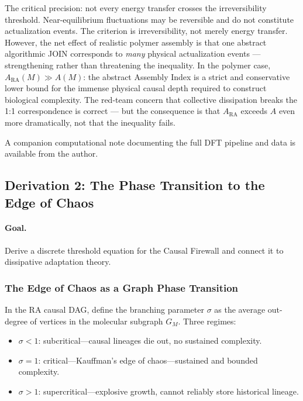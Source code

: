 \documentclass[11pt,a4paper]{article}
\theoremstyle{plain}
\theoremstyle{definition}
\theoremstyle{remark}
\newcommand{\ARA}{A_{\mathrm{RA}}}
\newcommand{\GM}{G_{M}}
\begin{document}
The critical precision: not every energy transfer crosses the irreversibility
threshold. Near-equilibrium fluctuations may be reversible and do not constitute
actualization events. The criterion is irreversibility, not merely energy
transfer. However, the net effect of realistic polymer assembly is that one
abstract algorithmic JOIN corresponds to \emph{many} physical actualization events
--- strengthening rather than threatening the inequality. In the polymer case,
$\ARA(M) \gg A(M)$: the abstract Assembly Index is a strict and conservative
lower bound for the immense physical causal depth required to construct biological
complexity. The red-team concern that collective dissipation breaks the 1:1
correspondence is correct --- but the consequence is that $\ARA$ exceeds $A$ even
more dramatically, not that the inequality fails.

A companion computational note documenting the full DFT pipeline and data is
available from the author.

\subsection{Derivation 2: The Phase Transition to the Edge of Chaos}
\label{sec:firewall-math}

\paragraph{Goal.} Derive a discrete threshold equation for the Causal Firewall
and connect it to dissipative adaptation theory.

\subsubsection{The Edge of Chaos as a Graph Phase Transition}

In the RA causal DAG, define the branching parameter $\sigma$ as the average
out-degree of vertices in the molecular subgraph $\GM$. Three regimes:
\begin{itemize}
  \item $\sigma < 1$: subcritical---causal lineages die out, no sustained complexity.
  \item $\sigma = 1$: critical---Kauffman's edge of chaos---sustained and bounded complexity.
  \item $\sigma > 1$: supercritical---explosive growth, cannot reliably store historical lineage.
\end{itemize}
\end{document}
